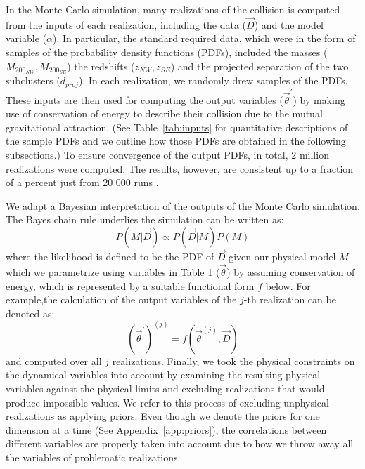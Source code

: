 In the Monte Carlo simulation, many realizations of the collision is
computed from the inputs of each realization, including
the data ($\vec{D}$) and the model variable ($\alpha$). In particular,
the standard required data, which were in the form of samples of the
probability density functions (PDFs), included the masses ($M_{200_{NW}},M_{200_{SE}}$) the
redshifts ($z_{NW}, z_{SE}$) and the projected separation of the two
subclusters ($d_{proj}$).  
In each realization, we randomly drew samples of the PDFs.
These inputs are then used for computing the output variables
($\vec{\theta}^\prime$) by making use of conservation of energy to describe
their collision due to the mutual gravitational attraction.
(See Table~\ref{tab:inputs}
for quantitative descriptions of the sample PDFs and we outline how those
PDFs are obtained in the following subsections.) 
To ensure convergence of the output PDFs, in total, 2 million realizations were computed. 
The results, however, are consistent up to a fraction of a percent just from 20 000 runs
.\par    
We adapt a Bayesian interpretation of the outputs of the Monte Carlo
simulation. The Bayes chain rule underlies the simulation can be written as:
\begin{equation}
    P(M|\vec{D}) \propto P(\vec{D}|M)P(M)
\end{equation}
where the likelihood is defined to be the PDF of $\vec{D}$ given our
physical model $M$ which we parametrize using variables in Table 1
($\vec{\theta}$) by
assuming conservation of energy, which is
represented by a suitable functional form $f$ below. For example,the
calculation of the output variables of the $j$-th realization can be denoted as: 
\begin{equation}
    (\vec{\theta}^\prime)^{(j)} = f(\vec{\theta}^{(j)}, \vec{D}) 
\end{equation}    
and computed over all $j$ realizations. Finally, we took the physical
constraints on the dynamical variables into account by
examining the resulting physical variables against the physical limits and
excluding realizations that would produce impossible values. We refer to this
process of excluding unphysical realizations as applying priors. 
Even though we denote the priors for one dimension at a time (See Appendix~\ref{app:priors}), 
the correlations between different variables are properly taken into account
 due to how we throw away all the variables of problematic
realizations. 

